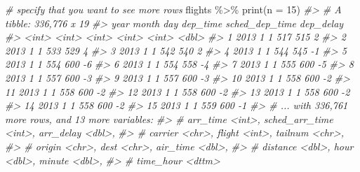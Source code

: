 \documentclass[
]{book}
\newenvironment{Shaded}{\begin{snugshade}}{\end{snugshade}}
\newcommand{\AttributeTok}[1]{\textcolor[rgb]{0.77,0.63,0.00}{#1}}
\newcommand{\CommentTok}[1]{\textcolor[rgb]{0.56,0.35,0.01}{\textit{#1}}}
\newcommand{\DecValTok}[1]{\textcolor[rgb]{0.00,0.00,0.81}{#1}}
\newcommand{\FunctionTok}[1]{\textcolor[rgb]{0.00,0.00,0.00}{#1}}
\newcommand{\NormalTok}[1]{#1}
\newcommand{\SpecialCharTok}[1]{\textcolor[rgb]{0.00,0.00,0.00}{#1}}
\begin{document}
\begin{Shaded}
\begin{Highlighting}[]
\CommentTok{\# specify that you want to see more rows}
\NormalTok{flights }\SpecialCharTok{\%\textgreater{}\%} \FunctionTok{print}\NormalTok{(}\AttributeTok{n =} \DecValTok{15}\NormalTok{)}
\CommentTok{\#\textgreater{} \# A tibble: 336,776 x 19}
\CommentTok{\#\textgreater{}     year month   day dep\_time sched\_dep\_time dep\_delay}
\CommentTok{\#\textgreater{}    \textless{}int\textgreater{} \textless{}int\textgreater{} \textless{}int\textgreater{}    \textless{}int\textgreater{}          \textless{}int\textgreater{}     \textless{}dbl\textgreater{}}
\CommentTok{\#\textgreater{}  1  2013     1     1      517            515         2}
\CommentTok{\#\textgreater{}  2  2013     1     1      533            529         4}
\CommentTok{\#\textgreater{}  3  2013     1     1      542            540         2}
\CommentTok{\#\textgreater{}  4  2013     1     1      544            545        {-}1}
\CommentTok{\#\textgreater{}  5  2013     1     1      554            600        {-}6}
\CommentTok{\#\textgreater{}  6  2013     1     1      554            558        {-}4}
\CommentTok{\#\textgreater{}  7  2013     1     1      555            600        {-}5}
\CommentTok{\#\textgreater{}  8  2013     1     1      557            600        {-}3}
\CommentTok{\#\textgreater{}  9  2013     1     1      557            600        {-}3}
\CommentTok{\#\textgreater{} 10  2013     1     1      558            600        {-}2}
\CommentTok{\#\textgreater{} 11  2013     1     1      558            600        {-}2}
\CommentTok{\#\textgreater{} 12  2013     1     1      558            600        {-}2}
\CommentTok{\#\textgreater{} 13  2013     1     1      558            600        {-}2}
\CommentTok{\#\textgreater{} 14  2013     1     1      558            600        {-}2}
\CommentTok{\#\textgreater{} 15  2013     1     1      559            600        {-}1}
\CommentTok{\#\textgreater{} \# ... with 336,761 more rows, and 13 more variables:}
\CommentTok{\#\textgreater{} \#   arr\_time \textless{}int\textgreater{}, sched\_arr\_time \textless{}int\textgreater{}, arr\_delay \textless{}dbl\textgreater{},}
\CommentTok{\#\textgreater{} \#   carrier \textless{}chr\textgreater{}, flight \textless{}int\textgreater{}, tailnum \textless{}chr\textgreater{},}
\CommentTok{\#\textgreater{} \#   origin \textless{}chr\textgreater{}, dest \textless{}chr\textgreater{}, air\_time \textless{}dbl\textgreater{},}
\CommentTok{\#\textgreater{} \#   distance \textless{}dbl\textgreater{}, hour \textless{}dbl\textgreater{}, minute \textless{}dbl\textgreater{},}
\CommentTok{\#\textgreater{} \#   time\_hour \textless{}dttm\textgreater{}}
\end{Highlighting}
\end{Shaded}
\end{document}
